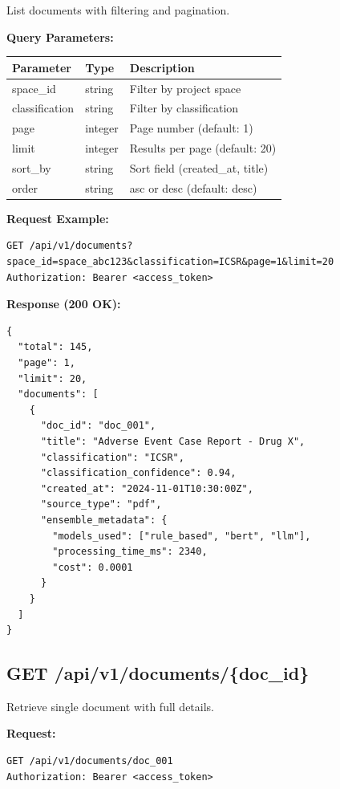 List documents with filtering and pagination.

\textbf{Query Parameters:}
\begin{table}[h]
\centering
\begin{tabularx}{\textwidth}{llX}
\toprule
\textbf{Parameter} & \textbf{Type} & \textbf{Description} \\
\midrule
space\_id & string & Filter by project space \\
classification & string & Filter by classification \\
page & integer & Page number (default: 1) \\
limit & integer & Results per page (default: 20) \\
sort\_by & string & Sort field (created\_at, title) \\
order & string & asc or desc (default: desc) \\
\bottomrule
\end{tabularx}
\end{table}

\textbf{Request Example:}
\begin{lstlisting}[style=bashstyle]
GET /api/v1/documents?space_id=space_abc123&classification=ICSR&page=1&limit=20
Authorization: Bearer <access_token>
\end{lstlisting}

\textbf{Response (200 OK):}
\begin{lstlisting}[style=pythonstyle]
{
  "total": 145,
  "page": 1,
  "limit": 20,
  "documents": [
    {
      "doc_id": "doc_001",
      "title": "Adverse Event Case Report - Drug X",
      "classification": "ICSR",
      "classification_confidence": 0.94,
      "created_at": "2024-11-01T10:30:00Z",
      "source_type": "pdf",
      "ensemble_metadata": {
        "models_used": ["rule_based", "bert", "llm"],
        "processing_time_ms": 2340,
        "cost": 0.0001
      }
    }
  ]
}
\end{lstlisting}

\subsection{GET /api/v1/documents/\{doc\_id\}}

Retrieve single document with full details.

\textbf{Request:}
\begin{lstlisting}[style=bashstyle]
GET /api/v1/documents/doc_001
Authorization: Bearer <access_token>
\end{lstlisting}

